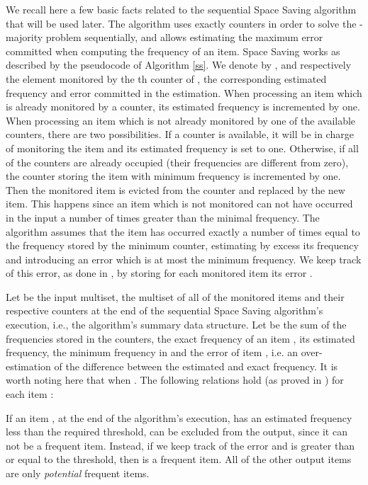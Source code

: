 \documentclass[final,3p,times]{elsarticle}
\begin{document}
We recall here a few basic facts related to the sequential Space Saving algorithm that will be used later. The algorithm uses exactly  counters in order to solve the -majority problem sequentially, and allows estimating the maximum error committed when computing the frequency of an item. 
Space Saving works as described by the pseudocode of Algorithm \ref{ss}. We denote by ,  and  respectively the element monitored by the th counter of , the corresponding estimated frequency and error committed in the estimation. When processing an item which is already monitored by a counter, its estimated frequency is incremented by one. When processing an item which is not already monitored by one of the available counters, there are two possibilities. If a counter is available, it will be in charge of monitoring the item and its estimated frequency is set to one.  Otherwise, if all of the counters are already occupied (their frequencies are different from zero), the counter storing the item with minimum frequency is incremented by one. Then the monitored item is evicted from the counter and replaced by the new item. This happens since an item which is not monitored can not have occurred in the input a number of times greater than the minimal frequency. The algorithm assumes that the item has occurred exactly a number of times equal to the frequency stored by the minimum counter, estimating by excess its frequency and introducing an error which is at most the minimum frequency. We keep track of this error, as done in \cite{Metwally2006}, by storing for each monitored item its error .

Let  be the input multiset,  the multiset of all of the monitored items and their respective counters at the end of the sequential Space Saving algorithm's execution, i.e., the algorithm's summary data structure. Let   be the sum of the frequencies stored in the counters,  the exact frequency of an item ,  its estimated frequency,  the minimum frequency in  and  the error of item , i.e. an over-estimation of the difference between the estimated and exact frequency. It is worth noting here that  when  . 
The following relations hold (as proved in \cite{Metwally2006}) for each item :









If an item , at the end of the algorithm's execution, has an estimated frequency  less than the required threshold,  can be excluded from the output, since it can not be a frequent item. Instead, if we keep track of the error  and  is greater than or equal to the threshold, then  is a frequent item. All of the other output items are only \emph{potential} frequent items.
\end{document}
